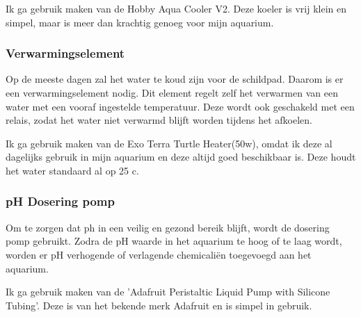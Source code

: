 \documentclass[a4paper]{report}
\begin{document}
Ik ga gebruik maken van de Hobby Aqua Cooler V2. Deze koeler is vrij klein en simpel, maar is meer dan krachtig genoeg voor mijn aquarium.

\subsubsection{Verwarmingselement}
Op de meeste dagen zal het water te koud zijn voor de schildpad. Daarom is er een verwarmingselement nodig. 
Dit element regelt zelf het verwarmen van een water met een vooraf ingestelde temperatuur. 
Deze wordt ook geschakeld met een relais, zodat het water niet verwarmd blijft worden tijdens het afkoelen.

Ik ga gebruik maken van de Exo Terra Turtle Heater(50w), omdat ik deze al dagelijks gebruik in mijn aquarium en deze altijd goed beschikbaar is.
Deze houdt het water standaard al op 25 \textdegree c. 

\subsubsection{pH Dosering pomp}
Om te zorgen dat ph in een veilig en gezond bereik blijft, wordt de dosering pomp gebruikt. 
Zodra de pH waarde in het aquarium te hoog of te laag wordt, worden er pH verhogende of verlagende chemicaliën toegevoegd aan het aquarium.

Ik ga gebruik maken van de 'Adafruit Peristaltic Liquid Pump with Silicone Tubing'. Deze is van het bekende merk Adafruit en is simpel in gebruik.

\end{document}
